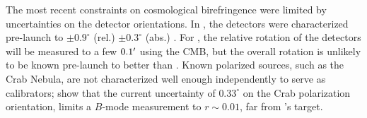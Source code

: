 \documentclass[PICOReport.tex]{subfiles}
\begin{document}
%
%

The most recent constraints on cosmological birefringence \citep{Planck2016_XLIX} were limited by uncertainties on the detector orientations.  In \planck, the detectors were characterized pre-launch to $\pm 0.9^\circ$ (rel.) $\pm 0.3^\circ$ (abs.) \citep{Rosset+2010}. For \pico, the relative rotation of the detectors will be measured to a few $0.1'$ using the CMB, but the overall rotation is unlikely to be known pre-launch to better than \planck.  Known polarized sources, such as the Crab Nebula, are not characterized well enough independently to serve as calibrators; \citet{Aumont+2018} show that the current uncertainty of $0.33^\circ$ on the Crab polarization orientation, limits a $B$-mode measurement to $r \sim 0.01$, far from \pico's target.

\end{document}
